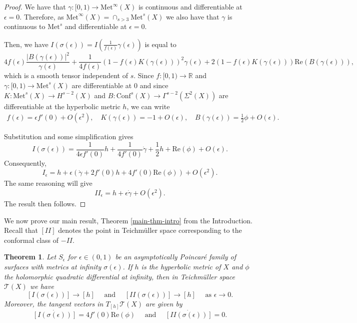 \documentclass{amsart}
\newcommand{\R}{\mathbb{R}}
\newtheorem{thm}{Theorem}[section]
\newcommand{\two}{I\!\!I}
\begin{document}
\begin{proof}
We have that $\gamma:[0,1) \to \mathrm{Met}^\infty(X)$ is continuous and differentiable at $\epsilon = 0$. 
Therefore, as $\mathrm{Met}^\infty(X) = \cap_{s > 3} \mathrm{Met}^s(X)$ we also have that $\gamma$ is continuous to $\mathrm{Met}^s$ and differentiable at $\epsilon = 0$. 

Then, we have $I(\sigma(\epsilon)) = I(\frac{1}{f(\epsilon)} \gamma(\epsilon))$ is equal to 
\[
4 f(\epsilon) \frac{|B(\gamma(\epsilon))|^2}{\gamma(\epsilon)} + \frac{1}{4 f(\epsilon)}(1 - f(\epsilon) K(\gamma(\epsilon)))^2 \gamma(\epsilon) + 2(1 - f(\epsilon)K(\gamma(\epsilon)))\mathrm{Re}(B(\gamma(\epsilon))),
\]
which is a smooth tensor independent of $s$. 
Since $f:[0,1) \to \R$ and $\gamma:[0,1) \to \mathrm{Met}^s(X)$ are differentiable at 0 and since $K: \mathrm{Met}^s(X) \to H^{s-2}(X)$ and $B: \mathrm{Conf}^s(X) \to \Gamma^{s-2}(\Sigma^{2}(X))$ are differentiable at the hyperbolic metric $h$, we can write 
\begin{align*}
f(\epsilon) = \epsilon f'(0) + O(\epsilon^2), \quad
K(\gamma(\epsilon)) = -1 + O(\epsilon), \quad 
B(\gamma(\epsilon)) = \frac{1}{2} \phi + O(\epsilon).
\end{align*}

Substitution and some simplification gives 
\[
I(\sigma(\epsilon)) = \frac{1}{4\epsilon f'(0)} h + \frac{1}{4 f'(0)} \dot{\gamma} + \frac{1}{2} h + \mathrm{Re}(\phi) + O(\epsilon).
\]
Consequently, 
\[
I_\epsilon =  h + \epsilon(\dot{\gamma} + 2 f'(0)h + 4 f'(0) \mathrm{Re}(\phi)) + O(\epsilon^2).
\]
The same reasoning will give 
\[
\two_\epsilon = h + \epsilon \dot{\gamma} + O(\epsilon^2).
\]
The result then follows.
\end{proof}


We now prove our main result, Theorem \ref{main-thm-intro} from the Introduction. 
Recall that $[\two]$ denotes the point in Teichm\"uller space corresponding to the conformal class of $-\two$.


\begin{thm}\label{main-result}
Let $S_\epsilon$ for $\epsilon \in (0,1)$ be an asymptotically Poincar\'e family of surfaces with metrics at infinity $\sigma(\epsilon)$. 
If $h$ is the hyperbolic metric of $X$ and $\phi$  the holomorphic quadratic differential at infinity, then in Teichm\"uller space $\mathcal{T}(X)$ we have 
\[
[I(\sigma(\epsilon))] \to [h]
\quad \text{ and } \quad
[\two(\sigma(\epsilon))] \to [h]
\quad \text{ as } \epsilon \to 0.
\]
Moreover, the tangent vectors in $T_{[h]} \mathcal{T}(X)$ are given by 
\[
\dot{[I(\sigma(\epsilon))]}  = 4 f'(0) \mathrm{Re}(\phi) \quad \text{ and } \quad \dot{[\two(\sigma(\epsilon))]} = 0.
\]
\end{thm}
\end{document}
